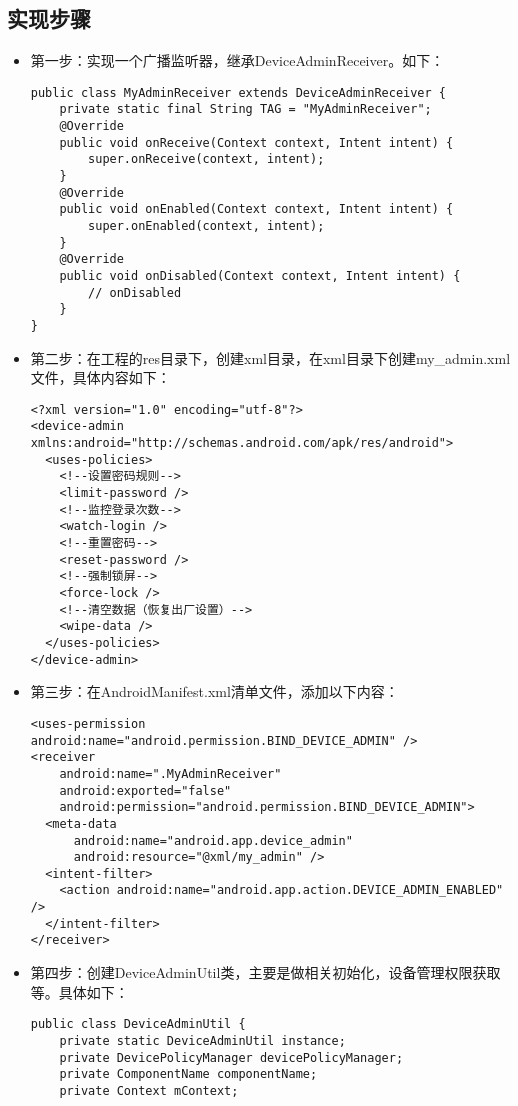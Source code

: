 \documentclass[9pt, b5paper]{article}
\begin{document}
\subsection{实现步骤}
\label{sec-1-1}
\begin{itemize}
\item 第一步：实现一个广播监听器，继承DeviceAdminReceiver。如下：
\begin{verbatim}
public class MyAdminReceiver extends DeviceAdminReceiver {
    private static final String TAG = "MyAdminReceiver";
    @Override
    public void onReceive(Context context, Intent intent) {
        super.onReceive(context, intent);
    }
    @Override
    public void onEnabled(Context context, Intent intent) {
        super.onEnabled(context, intent);
    }
    @Override
    public void onDisabled(Context context, Intent intent) {
        // onDisabled
    }
}
\end{verbatim}
\item 第二步：在工程的res目录下，创建xml目录，在xml目录下创建my\_admin.xml文件，具体内容如下：
\begin{verbatim}
<?xml version="1.0" encoding="utf-8"?>
<device-admin xmlns:android="http://schemas.android.com/apk/res/android">
  <uses-policies>
    <!--设置密码规则-->
    <limit-password />
    <!--监控登录次数-->
    <watch-login />
    <!--重置密码-->
    <reset-password />
    <!--强制锁屏-->
    <force-lock />
    <!--清空数据（恢复出厂设置）-->
    <wipe-data />
  </uses-policies>
</device-admin>
\end{verbatim}
\item 第三步：在AndroidManifest.xml清单文件，添加以下内容：  
\begin{verbatim}
<uses-permission android:name="android.permission.BIND_DEVICE_ADMIN" />
<receiver
    android:name=".MyAdminReceiver"
    android:exported="false"
    android:permission="android.permission.BIND_DEVICE_ADMIN">
  <meta-data
      android:name="android.app.device_admin"
      android:resource="@xml/my_admin" />
  <intent-filter>
    <action android:name="android.app.action.DEVICE_ADMIN_ENABLED" />
  </intent-filter>
</receiver>
\end{verbatim}
\item 第四步：创建DeviceAdminUtil类，主要是做相关初始化，设备管理权限获取等。具体如下：
\begin{verbatim}
public class DeviceAdminUtil {
    private static DeviceAdminUtil instance;
    private DevicePolicyManager devicePolicyManager;
    private ComponentName componentName;
    private Context mContext;
    

\end{verbatim}
\end{itemize}
\end{document}
